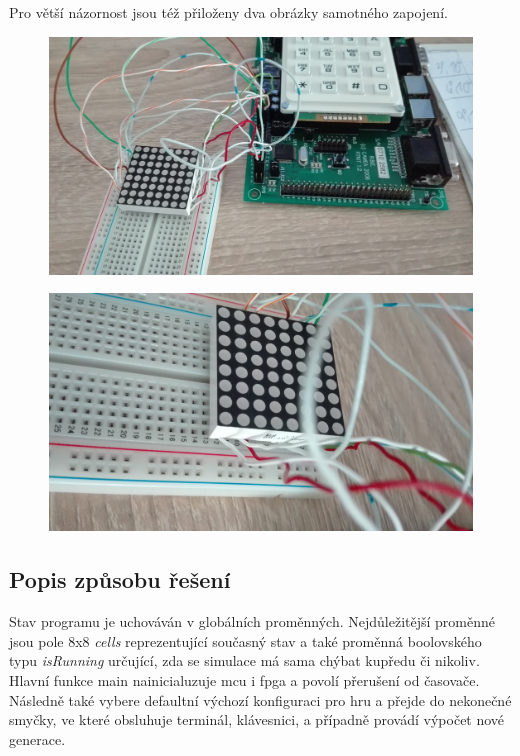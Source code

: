 \documentclass[12pt,a4paper,titlepage]{article}
\begin{document}
Pro větší názornost jsou též přiloženy dva obrázky samotného zapojení.

\begin{figure}[h]
\centering
\includegraphics[scale=0.2]{fitkit_resized}
 \label{foto}
\end{figure}

\begin{figure}[h]
\centering
\includegraphics[scale=0.2]{fitkit2_resized}
 \label{foto2}
\end{figure}

\subsection{Popis způsobu řešení}
Stav programu je uchováván v globálních proměnných. Nejdůležitější proměnné jsou pole 8x8 \textit{cells} reprezentující současný stav a také proměnná boolovského typu \textit{isRunning} určující, zda se simulace má sama chýbat kupředu či nikoliv. Hlavní funkce main nainicialuzuje mcu i fpga a povolí přerušení od časovače. Následně také vybere defaultní výchozí konfiguraci pro hru a přejde do nekonečné smyčky, ve které obsluhuje terminál, klávesnici, a případně provádí výpočet nové generace.
\end{document}
